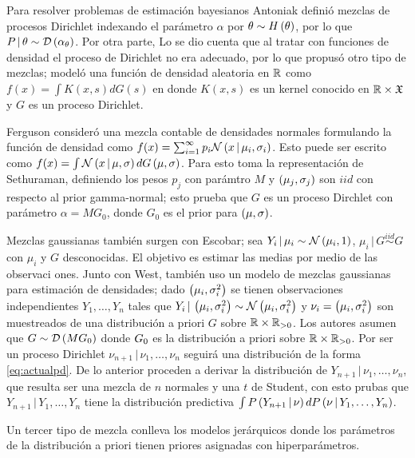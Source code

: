 Para resolver problemas de estimación bayesianos Antoniak definió mezclas de procesos Dirichlet indexando el parámetro %
$\alpha$ por $\theta \sim H\left( \theta \right)$, por lo que $P \,|\, \theta \sim \mathcal{D}\left( \alpha_{\theta} \right)$. Por otra parte, Lo se %
dio cuenta que al tratar con funciones de densidad el proceso de Dirichlet no era adecuado, por lo que propusó otro tipo %
de mezclas; modeló una función de densidad aleatoria en $\mathbb{R}$ como $f(x) = \int K(x, s) dG(s)$ en donde $K(x,s)$ es un %
kernel conocido en $\mathbb{R} \times \mathfrak{X}$ y $G$ es un proceso Dirichlet. 

Ferguson consideró una mezcla contable de densidades normales formulando la función de densidad como $f(x) = \sum_{i = %
1}^{\infty} p_{i} \Nor\Pp{x \,|\, \mu_{i}, \sigma_{i}}$. Esto puede ser escrito como $f(x) = \int \Nor\Pp{x \,|\, \mu, %
\sigma} dG\Pp{\mu, \sigma}$. Para esto toma la representación de Sethuraman, definiendo los pesos $p_{j}$ con parámtro %
$M$ y $\left( \mu_{j}, \sigma_{j} \right)$ son $iid$ con respecto al prior gamma-normal; esto prueba que $G$ es un proceso Dirchlet %
con parámetro $\alpha = M G_{0}$, donde $G_{0}$ es el prior para $\left( \mu, \sigma \right)$.

Mezclas gaussianas también surgen con Escobar; sea $Y_{i} \,|\, \mu_{i} \sim \mathcal{N}\left( \mu_{i}, 1 \right)$, $\mu_{i} \,|\, G %
\stackrel{iid}{\sim} G$ con $\mu_{i}$ y $G$ desconocidas. El objetivo es estimar las medias por medio de las observaci%
ones. Junto con West, también uso un modelo de mezclas gaussianas para estimación de densidades; dado $\Pp{\mu_{i}, %
\sigma_{i}^{2}}$ se tienen observaciones independientes $Y_{1}, \ldots, Y_{n}$ tales que $Y_{i} \,|\, \Pp{\mu_{i}, %
\sigma_{i}^{2}} \sim \Nor\Pp{\mu_{i}, \sigma_{i}^{2}}$ y $\nu_{i} = \left( \mu_{i}, \sigma_{i}^{2} \right)$ son muestreados de %
una distribución a priori $G$ sobre $\mathbb{R} \times \mathbb{R}_{> 0}$. Los autores asumen que $G \sim \mathcal{D}\left( M G_{0} \right)$ donde $G_{%
0}$ es la distribución a priori sobre $\mathbb{R} \times \mathbb{R}_{> 0}$. Por ser un proceso Dirichlet $\nu_{n+1} \,|\, \nu_{1}, %
\ldots, \nu_{n}$ seguirá una distribución de la forma \eqref{eq:actualpd}. De lo anterior proceden a derivar la %
distribución de $Y_{n+1} \,|\, \nu_{1}, \ldots, \nu_{n}$, que resulta ser una mezcla de $n$ normales y una $t$ de %
Student, con esto prubas que  $Y_{n+1} \,|\, Y_{1},\ldots, Y_{n}$ tiene la distribución predictiva $\int P\Pp{%
Y_{n+1} \,|\, \mathbf{\nu}} dP\Pp{\mathbf{\nu} \,|\, Y_{1}, \ldots, Y_{n}}$.

Un tercer tipo de mezcla conlleva los modelos jerárquicos donde los parámetros de la distribución a priori tienen %
priores asignadas con hiperparámetros. 

